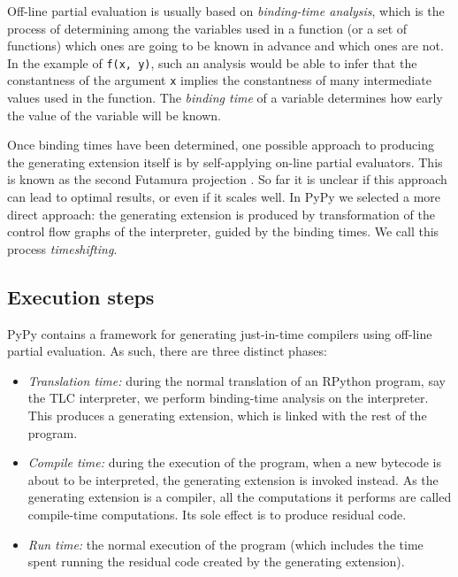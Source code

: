 Off-line partial evaluation is usually based on \emph{binding-time analysis}, which
is the process of determining among the variables used in a function (or
a set of functions) which ones are going to be known in advance and
which ones are not.  In the example of \texttt{f(x, y)}, such an analysis
would be able to infer that the constantness of the argument \texttt{x}
implies the constantness of many intermediate values used in the
function.  The \emph{binding time} of a variable determines how early the
value of the variable will be known.

Once binding times have been determined, one possible approach to
producing the generating extension itself is by self-applying on-line
partial evaluators.  This is known as the second Futamura projection
\cite{Futamura99}.  So far it is unclear if this approach can lead to optimal
results, or even if it scales well.  In PyPy we selected a more direct
approach: the generating extension is produced by transformation of the
control flow graphs of the interpreter, guided by the binding times.  We
call this process \emph{timeshifting}.


\subsection{Execution steps}


PyPy contains a framework for generating just-in-time compilers using
off-line partial evaluation.  As such, there are three distinct phases:

\begin{itemize}
\item \emph{Translation time:} during the normal translation of an RPython
program, say the TLC interpreter, we perform binding-time analysis on the
interpreter.  This produces a generating extension, which is linked with the
rest of the program. 

\item \emph{Compile time:} during the execution of the program, when a new
bytecode is about to be interpreted, the generating extension is invoked
instead.  As the generating extension is a compiler, all the computations it
performs are called compile-time computations.  Its sole effect is to produce
residual code.

\item \emph{Run time:} the normal execution of the program (which includes the
time spent running the residual code created by the generating extension).
\end{itemize}

